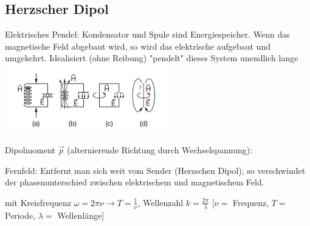 \subsection{Herzscher Dipol}
    Elektrisches Pendel: Kondensator und Spule sind Energiespeicher.
    Wenn das magnetische Feld abgebaut wird, so wird das elektrische aufgebaut und umgekehrt.
    Idealisiert (ohne Reibung) "pendelt" dieses System unendlich lange
    \centering
    \includegraphics[height = 30mm]{src/images/herzscher_dipol.png}

    Dipolmoment $\vec{p}$ (alternierende Richtung durch Wechselspannung):

    Fernfeld: Entfernt man sich weit vom Sender (Herzschen Dipol), so verschwindet der phasenunterschied zwischen elektrischem und magnetischem Feld.

    mit Kreisfrequenz $\omega = 2 \pi \nu \rightarrow T = \frac{1}{\nu}$, Wellenzahl $k = \frac{2 \pi}{\lambda}$
    [$\nu = $ Frequenz, $T = $ Periode, $\lambda = $ Wellenlänge]
    \vfill \null \columnbreak
